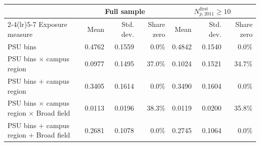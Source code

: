 \begin{tabular}{lrrrrrr}
\toprule
& \multicolumn{3}{c}{Full sample} & \multicolumn{3}{c}{\(N^{\mathrm{first}}_{p,2011}\geq10\)} \\
\cmidrule(lr){2-4}\cmidrule(lr){5-7}
Exposure measure & Mean & Std. dev. & Share zero & Mean & Std. dev. & Share zero \\
\midrule
PSU bins & 0.4762 & 0.1559 &  0.0\% & 0.4842 & 0.1540 &  0.0\% \\
PSU bins \(\times\) campus region & 0.0977 & 0.1495 & 37.0\% & 0.1024 & 0.1521 & 34.7\% \\
PSU bins \(+\) campus region & 0.3405 & 0.1614 &  0.0\% & 0.3490 & 0.1604 &  0.0\% \\
\addlinespace[0.04cm]
PSU bins \(\times\) campus region \(\times\) Broad field & 0.0113 & 0.0196 & 38.3\% & 0.0119 & 0.0200 & 35.8\% \\
PSU bins \(+\) campus region \(+\) Broad field & 0.2681 & 0.1078 &  0.0\% & 0.2745 & 0.1064 &  0.0\% \\
\bottomrule
\end{tabular}
